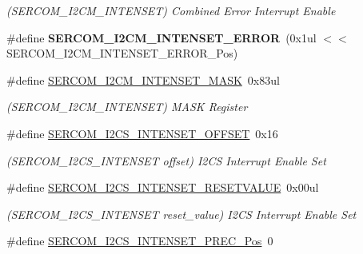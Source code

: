\begin{DoxyCompactItemize}
\begin{DoxyCompactList}\small\item\em (S\+E\+R\+C\+O\+M\+\_\+\+I2\+C\+M\+\_\+\+I\+N\+T\+E\+N\+S\+E\+T) Combined Error Interrupt Enable \end{DoxyCompactList}\item 
\hypertarget{group___s_a_m_l21___s_e_r_c_o_m_ga7753e91d638b445c4c4f66d5914753c5}{}\#define {\bfseries S\+E\+R\+C\+O\+M\+\_\+\+I2\+C\+M\+\_\+\+I\+N\+T\+E\+N\+S\+E\+T\+\_\+\+E\+R\+R\+O\+R}~(0x1ul $<$$<$ S\+E\+R\+C\+O\+M\+\_\+\+I2\+C\+M\+\_\+\+I\+N\+T\+E\+N\+S\+E\+T\+\_\+\+E\+R\+R\+O\+R\+\_\+\+Pos)\label{group___s_a_m_l21___s_e_r_c_o_m_ga7753e91d638b445c4c4f66d5914753c5}

\item 
\hypertarget{group___s_a_m_l21___s_e_r_c_o_m_gad33609c35a74a61f7150960057cc79cb}{}\#define \hyperlink{group___s_a_m_l21___s_e_r_c_o_m_gad33609c35a74a61f7150960057cc79cb}{S\+E\+R\+C\+O\+M\+\_\+\+I2\+C\+M\+\_\+\+I\+N\+T\+E\+N\+S\+E\+T\+\_\+\+M\+A\+S\+K}~0x83ul\label{group___s_a_m_l21___s_e_r_c_o_m_gad33609c35a74a61f7150960057cc79cb}

\begin{DoxyCompactList}\small\item\em (S\+E\+R\+C\+O\+M\+\_\+\+I2\+C\+M\+\_\+\+I\+N\+T\+E\+N\+S\+E\+T) M\+A\+S\+K Register \end{DoxyCompactList}\item 
\hypertarget{group___s_a_m_l21___s_e_r_c_o_m_ga061579b8237e7987e048b3a6e0e24fa4}{}\#define \hyperlink{group___s_a_m_l21___s_e_r_c_o_m_ga061579b8237e7987e048b3a6e0e24fa4}{S\+E\+R\+C\+O\+M\+\_\+\+I2\+C\+S\+\_\+\+I\+N\+T\+E\+N\+S\+E\+T\+\_\+\+O\+F\+F\+S\+E\+T}~0x16\label{group___s_a_m_l21___s_e_r_c_o_m_ga061579b8237e7987e048b3a6e0e24fa4}

\begin{DoxyCompactList}\small\item\em (S\+E\+R\+C\+O\+M\+\_\+\+I2\+C\+S\+\_\+\+I\+N\+T\+E\+N\+S\+E\+T offset) I2\+C\+S Interrupt Enable Set \end{DoxyCompactList}\item 
\hypertarget{group___s_a_m_l21___s_e_r_c_o_m_ga01ebd8ef6374791fc7a95d1dd386740d}{}\#define \hyperlink{group___s_a_m_l21___s_e_r_c_o_m_ga01ebd8ef6374791fc7a95d1dd386740d}{S\+E\+R\+C\+O\+M\+\_\+\+I2\+C\+S\+\_\+\+I\+N\+T\+E\+N\+S\+E\+T\+\_\+\+R\+E\+S\+E\+T\+V\+A\+L\+U\+E}~0x00ul\label{group___s_a_m_l21___s_e_r_c_o_m_ga01ebd8ef6374791fc7a95d1dd386740d}

\begin{DoxyCompactList}\small\item\em (S\+E\+R\+C\+O\+M\+\_\+\+I2\+C\+S\+\_\+\+I\+N\+T\+E\+N\+S\+E\+T reset\+\_\+value) I2\+C\+S Interrupt Enable Set \end{DoxyCompactList}\item 
\hypertarget{group___s_a_m_l21___s_e_r_c_o_m_gaf2fa1970ed6d6fa4b622435e732b13f8}{}\#define \hyperlink{group___s_a_m_l21___s_e_r_c_o_m_gaf2fa1970ed6d6fa4b622435e732b13f8}{S\+E\+R\+C\+O\+M\+\_\+\+I2\+C\+S\+\_\+\+I\+N\+T\+E\+N\+S\+E\+T\+\_\+\+P\+R\+E\+C\+\_\+\+Pos}~0\label{group___s_a_m_l21___s_e_r_c_o_m_gaf2fa1970ed6d6fa4b622435e732b13f8}


\end{DoxyCompactItemize}
